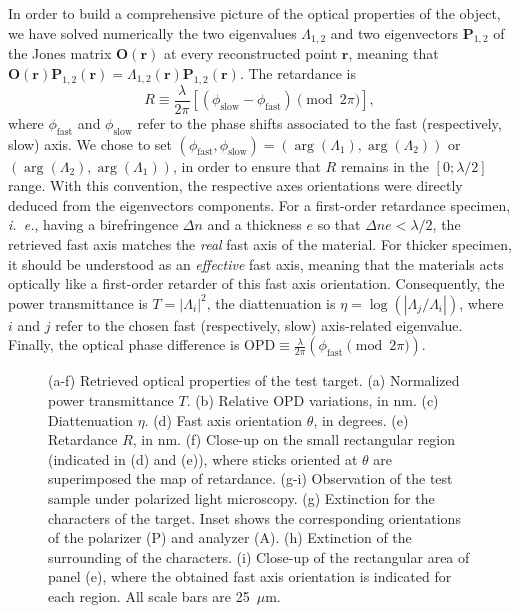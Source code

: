 \documentclass[aps,prl,twocolumn,amsmath]{revtex4-1}
\newcommand{\rb}{\mathbf{r}}
\newcommand{\Ob}{\mathbf{O}}
\newcommand{\Pb}{\mathbf{P}}
\begin{document}
In order to build a comprehensive picture of the optical properties of the object, we have solved numerically the two eigenvalues $\Lambda_{1,2}$ and two eigenvectors $\Pb_{1,2}$ of the Jones matrix $\Ob(\rb)$ at every reconstructed point $\rb$, meaning that $\Ob (\rb) \Pb_{1,2}(\rb) =\Lambda_{1,2}(\rb) \Pb_{1,2}(\rb)$. The retardance is 
\begin{equation}
R \equiv \frac{\lambda}{2\pi} \left[ (\phi_\text{slow} - \phi_\text{fast}) \pmod{2\pi} \right],
\end{equation}
where $\phi_\text{fast}$ and $\phi_\text{slow}$ refer to the phase shifts associated to the fast (respectively, slow) axis. We chose to set $(\phi_\text{fast},\phi_\text{slow}) = (\arg(\Lambda_1),\arg(\Lambda_2))$ or $(\arg(\Lambda_2),\arg(\Lambda_1))$, in order to ensure that $R$ remains in the $[0;\lambda/2]$ range. With this convention, the respective axes orientations were directly deduced from the eigenvectors components. For a first-order retardance specimen, \emph{i.~e.}, having a birefringence $\Delta n$ and a thickness $e$  so that $\Delta n e < \lambda/2$, the retrieved fast axis matches the \emph{real} fast axis of the material. For thicker specimen, it should be understood as an \emph{effective} fast axis, meaning that the materials acts optically like a first-order retarder of this fast axis orientation. Consequently, the power transmittance is $T=|\Lambda_i|^2$, the diattenuation is $\eta = \log(|\Lambda_j/\Lambda_i|)$, where $i$ and $j$ refer to the chosen fast (respectively, slow) axis-related eigenvalue. Finally, the optical phase difference is $\text{OPD} \equiv  \frac{\lambda}{2\pi} ( \phi_\text{fast} \pmod{2\pi})$.

   
   
\begin{figure}[!h]
\centering
{}
\caption{(a-f) Retrieved optical properties of the test target. (a) Normalized power transmittance $T$. (b) Relative OPD variations, in nm. (c) Diattenuation $\eta$. (d) Fast axis orientation $\theta$, in degrees. (e) Retardance $R$, in nm. (f) Close-up on the small rectangular region (indicated in (d) and (e)), where sticks oriented at $\theta$ are superimposed the map of retardance. (g-i) Observation of the test sample under polarized light microscopy. (g) Extinction for the characters of the target. Inset shows the corresponding orientations of the polarizer (P) and analyzer (A). (h) Extinction of the surrounding of the characters. (i) Close-up of the rectangular area of panel (e), where the obtained fast axis orientation is indicated for each region. All scale bars are 25~$\mu$m.}
\label{fig:Fig03}
\end{figure}
\end{document}

